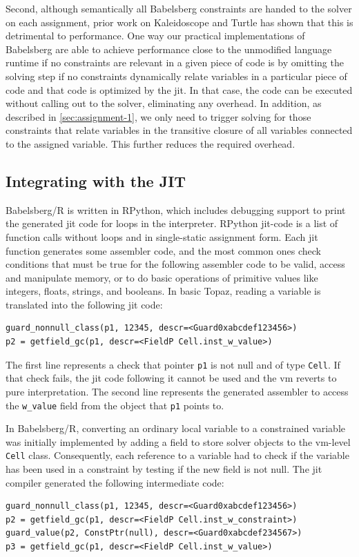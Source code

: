Second, although semantically all Babelsberg constraints are handed to the
solver on each assignment, prior work on Kaleidoscope and Turtle has shown that
this is detrimental to performance. One way our practical implementations of
Babelsberg are able to achieve performance close to the unmodified language
runtime if no constraints are relevant in a given piece of code is by omitting
the solving step if no constraints dynamically relate variables in a particular
piece of code and that code is optimized by the \ac{jit}. In that case, the code
can be executed without calling out to the solver, eliminating any overhead. In
addition, as described in \autoref{sec:assignment-1}, we only need to trigger
solving for those constraints that relate variables in the transitive closure of
all variables connected to the assigned variable. This further reduces the
required overhead.

\subsection*{Integrating with the JIT}
\label{sec:vm-based-solution}
Babelsberg/R is written in RPython, which includes debugging support to print
the generated \ac{jit} code for loops in the interpreter. RPython \ac{jit}-code
is a list of function calls without loops and in single-static assignment
form. Each \ac{jit} function generates some assembler code, and the most common
ones check conditions that must be true for the following assembler code to be
valid, access and manipulate memory, or to do basic operations of primitive
values like integers, floats, strings, and booleans. In basic Topaz, reading a
variable is translated into the following \ac{jit} code:
\begin{lstlisting}[language=pypytrace]
guard_nonnull_class(p1, 12345, descr=<Guard0xabcdef123456>)
p2 = getfield_gc(p1, descr=<FieldP Cell.inst_w_value>)
\end{lstlisting}
The first line represents a check that pointer \verb!p1!  is not null and of
type \verb!Cell!.  If that check fails, the \ac{jit} code following it cannot be
used and the \ac{vm} reverts to pure interpretation. The second line represents
the generated assembler to access the \verb!w_value! field from the object that
\verb!p1! points to.

In  Babelsberg/R,   converting  an   ordinary  local  variable   to  a
constrained variable  was initially implemented  by adding a  field to
store  solver   objects  to  the  \ac{vm}-level   \verb!Cell!   class.
Consequently,  each  reference to  a  variable  had  to check  if  the
variable has been used in a constraint  by testing if the new field is
not null.  The \ac{jit} compiler generated  the following intermediate
code:
\begin{lstlisting}[language=pypytrace]
guard_nonnull_class(p1, 12345, descr=<Guard0xabcdef123456>)
p2 = getfield_gc(p1, descr=<FieldP Cell.inst_w_constraint>)
guard_value(p2, ConstPtr(null), descr=<Guard0xabcdef234567>)
p3 = getfield_gc(p1, descr=<FieldP Cell.inst_w_value>)
\end{lstlisting}

